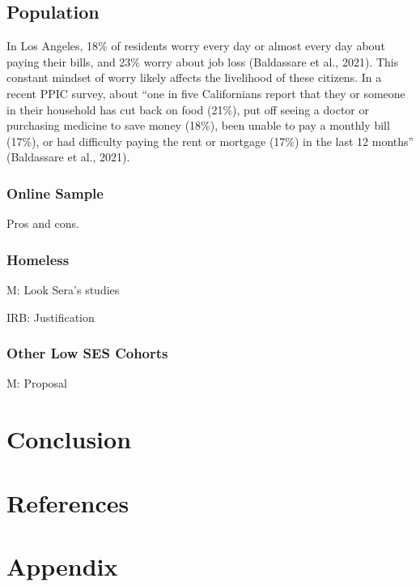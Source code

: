 \documentclass[
]{report}
\begin{document}
\hypertarget{population}{%
\section{Population}\label{population}}

In Los Angeles, 18\% of residents worry every day or almost every day
about paying their bills, and 23\% worry about job loss (Baldassare et
al., 2021). This constant mindset of worry likely affects the livelihood
of these citizens. In a recent PPIC survey, about ``one in five
Californians report that they or someone in their household has cut back
on food (21\%), put off seeing a doctor or purchasing medicine to save
money (18\%), been unable to pay a monthly bill (17\%), or had
difficulty paying the rent or mortgage (17\%) in the last 12 months''
(Baldassare et al., 2021).

\hypertarget{online-sample}{%
\subsection{Online Sample}\label{online-sample}}

Pros and cons.

\hypertarget{homeless}{%
\subsection{Homeless}\label{homeless}}

M: Look Sera's studies

IRB: Justification

\hypertarget{other-low-ses-cohorts}{%
\subsection{Other Low SES Cohorts}\label{other-low-ses-cohorts}}

M: Proposal

\hypertarget{conclusion}{%
\chapter{Conclusion}\label{conclusion}}

\hypertarget{references}{%
\chapter{References}\label{references}}

\hypertarget{appendix}{%
\chapter{Appendix}\label{appendix}}
\end{document}
